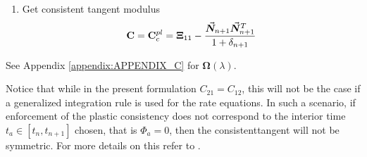 {\begin{tcolorbox}
\begin{enumerate}
			\vspace{-1.7cm}
			\hspace{-0.15cm}\begin{minipage}[t]{0.3\linewidth}
				\begin{alignat*}{2}
					\blacksquare\hspace{0.3cm}	&\bvec{\zeta}_{n+1} &&=
					\bm{\Omega}(\lambda)\bvec{\zeta}_{n+1}^{TR}\\
					\blacksquare\hspace{0.3cm}	&\bvec{\epsilon}^{pl}_{n+1} &&= 
					\bvec{\epsilon}^{pl}_n + \lambda\bvec{n}_{n+1}\\
					\blacksquare\hspace{0.3cm}	&\bvec{\alpha}_{n+1} &&= 
					\bvec{\alpha}_n + \lambda 
					H_{kin}\bmat{V}^{-1}\bvec{n}_{n+1}\\
				\end{alignat*}
			\end{minipage}
			\begin{minipage}[t]{0.4\linewidth}
				\begin{alignat*}{2}
					\blacksquare\hspace{0.3cm} &\bvec{\sigma}_{n+1} &&= 
					\bvec{\zeta}_{n+1} + \bvec{\alpha}_{n+1}\\
					\blacksquare\hspace{0.3cm} &e^{pl}_{n+1} &&= e^{pl}_n + 
					\lambda \\
					\blacksquare\hspace{0.3cm}	&q_{n+1} &&= q_n + 
					\lambda\frac{\partial
						q_{n+1}}{\partial e_{n+1}^{pl}}
				\end{alignat*}
			\end{minipage}
			
			\vspace{-0.5cm}
			\item Get consistent tangent modulus
			\vspace{-0.5cm}
			$$\mathbf{C}=\mathbf{C}_c^{pl} = 
			\mathbf{\Xi}_{11}-\frac{\vec{\bm{N}}_{n+1}\vec{\bm{N}}_{n+1}^T}{1+\delta_{n+1}}$$
		\end{enumerate}
		See Appendix \ref{appendix:APPENDIX_C} for $\bm{\Omega}(\lambda)$.
		\step\label{Box:BOX1}
	\end{tcolorbox}
}
\clearpage

Notice that while in the present formulation $C_{21}=C_{12}$, this will not be
the case if a generalized integration rule is used for the rate equations. In
such a scenario, if enforcement of the plastic consistency does not correspond
to the interior time $t_a\in[t_n, t_{n+1}]$ chosen, that is $\Phi_a=0$, then 
the consistenttangent will not be symmetric. For more details on this refer to
\cite{Ortiz1985}.

